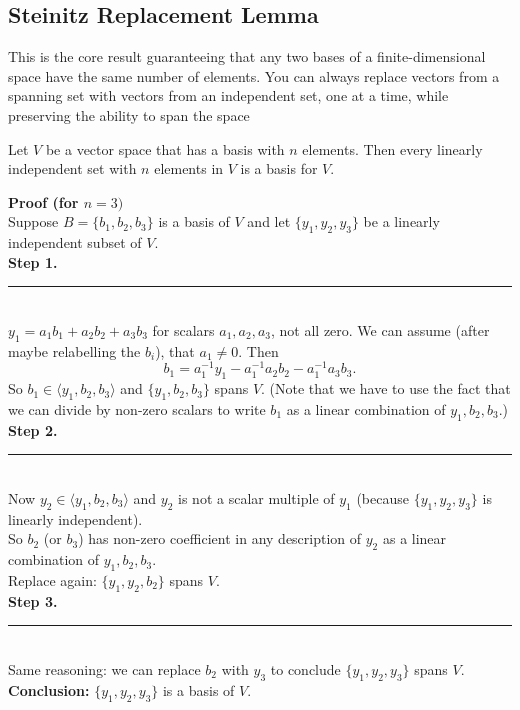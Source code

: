 \documentclass[a4paper, 9pt]{extarticle}
\begin{document}
\subsection{Steinitz Replacement Lemma}
This is the core result guaranteeing that any two bases of a finite-dimensional space have the same number of elements. You can always replace vectors from a spanning set with vectors from an independent set, one at a time, while preserving the ability to span the space
\begin{lemmabox}{}{}
  Let $V$ be a vector space that has a basis with $n$ elements. Then every linearly independent set with $n$ elements in $V$ is a basis for $V$.
\end{lemmabox}
\noindent \textbf{Proof (for $n = 3)$} \\
Suppose $B = \{b_1, b_2, b_3\}$ is a basis of $V$ and let $\{y_1, y_2, y_3\}$ be a linearly independent subset of $V$. \\[2ex]
\textbf{Step 1.} \rule[.25\baselineskip]{\textwidth}{0.5px}\\
$y_1 = a_1 b_1 + a_2 b_2 + a_3 b_3$ for scalars $a_1, a_2, a_3$, not all zero.
We can assume (after maybe relabelling the $b_i$), that $a_1 \ne 0$.
Then
$$
  b_1 = a_1^{-1} y_1 - a_1^{-1} a_2 b_2 - a_1^{-1} a_3 b_3.
$$
So $b_1 \in \langle y_1, b_2, b_3 \rangle$ and $\{y_1, b_2, b_3\}$ spans $V$.
(Note that we have to use the fact that we can divide by non-zero scalars to write $b_1$ as a linear combination of $y_1, b_2, b_3$.) \\[2ex]
\textbf{Step 2.} \rule[.25\baselineskip]{\textwidth}{0.5px}\\
Now $y_2 \in \langle y_1, b_2, b_3 \rangle$ and $y_2$ is not a scalar multiple of $y_1$ (because $\{y_1, y_2, y_3\}$ is linearly independent). \\
So $b_2$ (or $b_3$) has non-zero coefficient in any description of $y_2$ as a linear combination of $y_1, b_2, b_3$. \\
Replace again: $\{y_1, y_2, b_2\}$ spans $V$. \\[2ex]
\textbf{Step 3.} \rule[.25\baselineskip]{\textwidth}{0.5px}\\
Same reasoning: we can replace $b_2$ with $y_3$ to conclude $\{y_1, y_2, y_3\}$ spans $V$. \\[2ex]
\textbf{Conclusion:} $\{y_1, y_2, y_3\}$ is a basis of $V$.
\pagebreak
\end{document}
